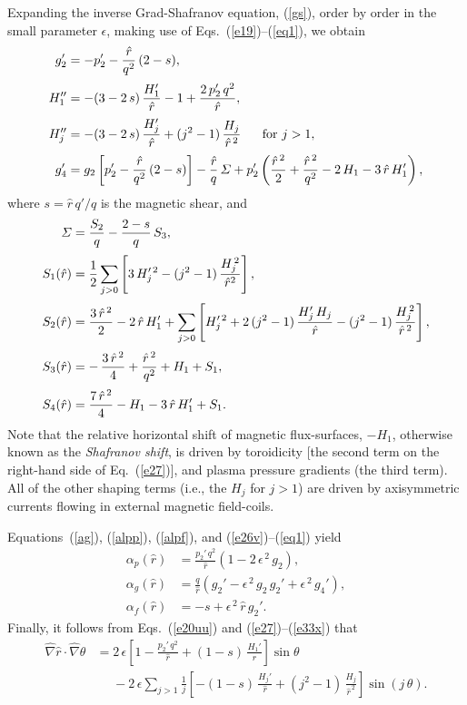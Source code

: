 \documentclass[12pt,prb,aps]{revtex4-1}
\begin{document}
Expanding the inverse Grad-Shafranov equation, (\ref{gs}), order by order in the
small parameter $\epsilon$, making use of Eqs.~(\ref{e19})--(\ref{eq1}), we obtain\,\cite{am1,tj,tj1}
\begin{align}
g_2'&=- p_2' - \frac{\hat{r}}{q^2}\,(2-s),\label{e26}\\[0.5ex]
H_1''&= -(3-2\,s)\,\frac{H_1' }{\hat{r}}
-1+\frac{2\,p_2'\,q^2}{\hat{r}},\label{e27}\\[0.5ex]
H_j''&= -(3-2\,s)\,\frac{H_j'}{\hat{r}}+(j^2-1)\,\frac{H_j}{\hat{r}^{\,2}}~~~~~\mbox{for $j>1$},\label{e33x}\\[0.5ex]
g_4'&= g_2\left[p_2' - \frac{\hat{r}}{q^2}\,(2-s)\right] - \frac{\hat{r}}{q}\,{\mit\Sigma}
+p_2'\left(\frac{\hat{r}^{\,2}}{2}+\frac{\hat{r}^{\,2}}{q^2}-2\,H_1-3\,\hat{r}\,H_1'\right),\label{e31}
\end{align}
where $s=\hat{r}\,q'/q$ is the magnetic shear, and  
\begin{align}{\mit\Sigma} &=\frac{S_2}{q}- \frac{2-s}{q}\,S_3,\\[0.5ex]
S_1(\hat{r})&=\frac{1}{2}\sum_{j>0} \left[3\,H_j'^{\,2} -(j^2-1)\,\frac{H_j^{\,2}}{\hat{r}^2}\right],\label{e109}
\\[0.5ex]
S_2(\hat{r})&=\frac{3\,\hat{r}^{\,2}}{2} -2\,\hat{r}\,H_1'+\sum_{j>0}\left[H_j'^{\,2}+2\,(j^2-1)\,\frac{H_j'\,H_j}{\hat{r}}-(j^2-1)\,\frac{H_j^{\,2}}{\hat{r}^{\,2}}\right],\\[0.5ex]
S_3(\hat{r})&=-\,\frac{3\,\hat{r}^{\,2}}{4}+\frac{\hat{r}^{\,2}}{q^2} +H_1+S_1,\\[0.5ex]
S_4(\hat{r}) &= \frac{7\,\hat{r}^{\,2}}{4}-H_1 -3\,\hat{r}\,H_1' + S_1.
\end{align}
Note that the relative horizontal shift of magnetic flux-surfaces, $-H_1$, otherwise known as the {\em Shafranov shift}, is driven by toroidicity [the second term on
the right-hand side of Eq.~(\ref{e27})], and plasma pressure gradients (the third term). All of the other shaping terms (i.e., the $H_j$ for $j>1$) are driven by axisymmetric currents flowing in external  magnetic field-coils.

Equations~(\ref{ag}), (\ref{alpp}), (\ref{alpf}), and (\ref{e26v})--(\ref{eq1}) yield\,\cite{tj}
\begin{align}
\alpha_p(\hat{r}) &= \frac{p_2'\,q^2}{\hat{r}}\left(1-2\,\epsilon^{\,2}\,g_2\right),\\[0.5ex]
\alpha_g(\hat{r}) &= \frac{q}{\hat{r}}\left(g_2' -\epsilon^{\,2}\,g_2\,g_2'+\epsilon^{\,2}\,g_4'\right),\\[0.5ex]
\alpha_f(\hat{r}) &= -s + \epsilon^{\,2}\,\hat{r}\,g_2'.
\end{align}
Finally, it follows from Eqs.~(\ref{e20uu}) and (\ref{e27})--(\ref{e33x}) that
\begin{align}\label{e114}
\hat{\nabla}\hat{r}\cdot\hat{\nabla}\theta &= 2\,\epsilon\left[1-\frac{p_2'\,q^2}{\hat{r}} +(1-s)\,\frac{H_1'}{\hat{r}}\right]\sin\theta\nonumber\\[0.5ex]
&\phantom{=}-2\,\epsilon\sum_{j>1}\frac{1}{j}\left[-(1-s)\,\frac{H_j'}{\hat{r}} + (j^2-1)\,\frac{H_j}{\hat{r}^{\,2}}\right]\sin(j\,\theta).
\end{align}
\end{document}
